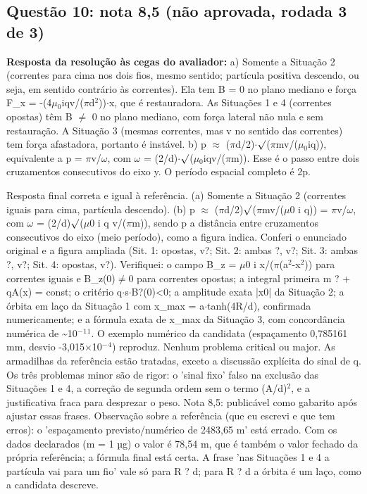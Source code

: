 \documentclass{article}%
\begin{document}
\subsection*{Questão 10: nota 8,5 (não aprovada, rodada 3 de 3)}%
\textbf{Resposta da resolução às cegas do avaliador:} a) Somente a Situação 2 (correntes para cima nos dois fios, mesmo sentido; partícula positiva descendo, ou seja, em sentido contrário às correntes). Ela tem B = 0 no plano mediano e força F\_x = -(4$\mu$$_{0}$iqv/($\pi$d$^2$))$\cdot$x, que é restauradora. As Situações 1 e 4 (correntes opostas) têm B $\neq$ 0 no plano mediano, com força lateral não nula e sem restauração. A Situação 3 (mesmas correntes, mas v no sentido das correntes) tem força afastadora, portanto é instável.\newline%
\newline%
b) p $\approx$ ($\pi$d/2)$\cdot$$\surd$($\pi$mv/($\mu$$_{0}$iq)), equivalente a p = $\pi$v/$\omega$, com $\omega$ = (2/d)$\cdot$$\surd$($\mu$$_{0}$iqv/($\pi$m)). Esse é o passo entre dois cruzamentos consecutivos do eixo y. O período espacial completo é 2p.\par %
Resposta final correta e igual à referência. (a) Somente a Situação 2 (correntes iguais para cima, partícula descendo). (b) p $\approx$ ($\pi$d/2)$\surd$($\pi$mv/($\mu$0 i q)) = $\pi$v/$\omega$, com $\omega$ = (2/d)$\surd$($\mu$0 i q v/($\pi$m)), sendo p a distância entre cruzamentos consecutivos do eixo (meio período), como a figura indica. Conferi o enunciado original e a figura ampliada (Sit. 1: opostas, v?; Sit. 2: ambas ?, v?; Sit. 3: ambas ?, v?; Sit. 4: opostas, v?). Verifiquei: o campo B\_z = $\mu$0 i x/($\pi$(a$^2$-x$^2$)) para correntes iguais e B\_z(0)$\neq$0 para correntes opostas; a integral primeira m ? + qA(x) = const; o critério q$\cdot$s$\cdot$B?(0)<0; a amplitude exata |x0| da Situação 2; a órbita em laço da Situação 1 com x\_max = a$\cdot$tanh(4R/d), confirmada numericamente; e a fórmula exata de x\_max da Situação 3, com concordância numérica de \textasciitilde{}10$^{-}$$^{1}$$^{1}$. O exemplo numérico da candidata (espaçamento 0,785161 mm, desvio -3,015$\times$10$^{-}$$^{4}$) reproduz. Nenhum problema critical ou major. As armadilhas da referência estão tratadas, exceto a discussão explícita do sinal de q. Os três problemas minor são de rigor: o 'sinal fixo' falso na exclusão das Situações 1 e 4, a correção de segunda ordem sem o termo (A/d)$^2$, e a justificativa fraca para desprezar o peso. Nota 8,5: publicável como gabarito após ajustar essas frases. Observação sobre a referência (que eu escrevi e que tem erros): o 'espaçamento previsto/numérico de 2483,65 m' está errado. Com os dados declarados (m = 1 µg) o valor é 78,54 m, que é também o valor fechado da própria referência; a fórmula final está certa. A frase 'nas Situações 1 e 4 a partícula vai para um fio' vale só para R ? d; para R ? d a órbita é um laço, como a candidata descreve.%
\end{document}
